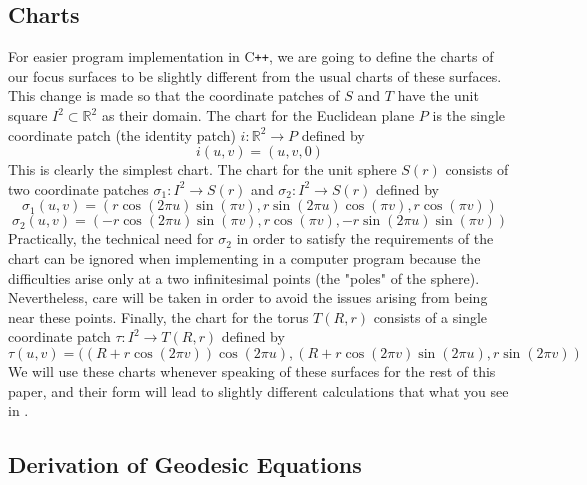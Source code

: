 \documentclass{article}
\newcommand{\R}{\mathbb{R}}
\begin{document}
	\subsection{Charts}
		For easier program implementation in C\texttt{++}, we are going to define the charts of our focus surfaces to be slightly different from the usual charts of these surfaces.
		This change is made so that the coordinate patches of $S$ and $T$ have the unit square $I^2 \subset \R^2$ as their domain.
		The chart for the Euclidean plane $P$ is the single coordinate patch (the identity patch) $i: \R^2 \to P$ defined by
		$$ i(u,v) = ( u , v , 0 ) $$
		This is clearly the simplest chart.
		The chart for the unit sphere $S(r)$ consists of two coordinate patches $\sigma_1:I^2 \to S(r)$ and $\sigma_2:I^2 \to S(r)$ defined by
		$$ \sigma_1(u,v) = ( r\cos(2\pi u)\sin(\pi v) , r\sin(2\pi u)\cos(\pi v) , r\cos(\pi v) ) $$
		$$ \sigma_2(u,v) = ( -r\cos(2\pi u)\sin(\pi v) , r\cos(\pi v) , -r\sin(2\pi u)\sin(\pi v) ) $$
		Practically, the technical need for $\sigma_2$ in order to satisfy the requirements of the chart can be ignored when implementing in a computer program because the difficulties arise only at a two infinitesimal points (the "poles" of the sphere).
		Nevertheless, care will be taken in order to avoid the issues arising from being near these points. 
		Finally, the chart for the torus $T(R,r)$ consists of a single coordinate patch $\tau:I^2 \to T(R,r)$ defined by
		$$ \tau(u,v) = ( (R+r\cos(2\pi v))\cos(2\pi u) , (R+r\cos(2\pi v)\sin(2\pi u) , r\sin(2\pi v) ) $$
		We will use these charts whenever speaking of these surfaces for the rest of this paper, and their form will lead to slightly different calculations that what you see in \cite{BanchoffLovett_DiffGeo_2010,Irons_GeodesicsTorus_2005}.
		

	\subsection{Derivation of Geodesic Equations}
	
\end{document}
